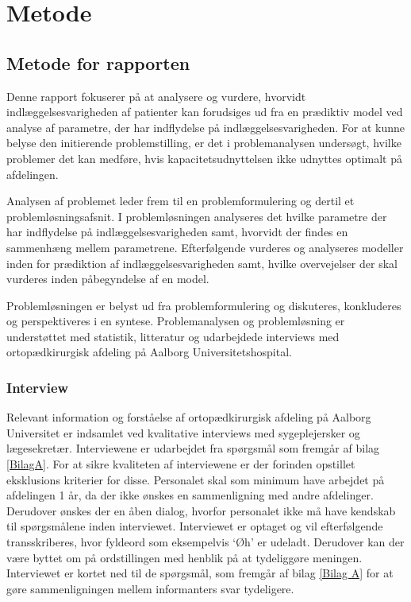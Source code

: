 \chapter*{Metode}
\section*{Metode for rapporten}
Denne rapport fokuserer på at analysere og vurdere, hvorvidt indlæggelsesvarigheden af patienter kan forudsiges ud fra en prædiktiv model ved analyse af parametre, der har indflydelse på indlæggelsesvarigheden. For at kunne belyse den initierende problemstilling, er det i problemanalysen undersøgt, hvilke problemer det kan medføre, hvis kapacitetsudnyttelsen ikke udnyttes optimalt på afdelingen. %

Analysen af problemet leder frem til en problemformulering og dertil et problemløsningsafsnit. I problemløsningen analyseres det hvilke parametre der har indflydelse på indlæggelsesvarigheden samt, hvorvidt der findes en sammenhæng mellem parametrene. Efterfølgende vurderes og analyseres modeller inden for prædiktion af indlæggelsesvarigheden samt, hvilke overvejelser der skal vurderes inden påbegyndelse af en model. 


Problemløsningen er belyst ud fra problemformulering og diskuteres, konkluderes og perspektiveres i en syntese. Problemanalysen og problemløsning er understøttet med statistik, litteratur og udarbejdede interviews med ortopædkirurgisk afdeling på Aalborg Universitetshospital.


\subsection*{Interview}
Relevant information og forståelse af ortopædkirurgisk afdeling på Aalborg Universitet er indsamlet ved kvalitative interviews med sygeplejersker og lægesekretær. Interviewene er udarbejdet fra spørgsmål som fremgår af bilag \ref{BilagA}. For at sikre kvaliteten af interviewene er der forinden opstillet eksklusions kriterier for disse. Personalet skal som minimum have arbejdet på afdelingen 1 år, da der ikke ønskes en sammenligning med andre afdelinger. Derudover ønskes der en åben dialog, hvorfor personalet ikke må have kendskab til spørgsmålene inden interviewet. Interviewet er optaget og vil efterfølgende transskriberes, hvor fyldeord som eksempelvis ‘Øh’ er udeladt. Derudover kan der være byttet om på ordstillingen med henblik på at tydeliggøre meningen. Interviewet er kortet ned til de spørgsmål, som fremgår af bilag \ref{Bilag A} for at gøre sammenligningen mellem informanters svar tydeligere.


